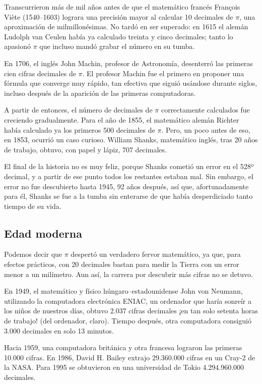 {Transcurrieron más de mil años antes de que el matemático francés Fran\c{c}ois Vi\`ete (1540--1603) lograra una precisión mayor 
al calcular 10 decimales de $\pi$, una aproximación de milmillonésimas. 
No tardó en ser superado: en 1615 el alemán Ludolph van Ceulen había ya calculado treinta y cinco decimales; tanto lo 
apasionó $\pi$ que incluso mandó grabar el número en su tumba.

En 1706, el inglés John Machin, profesor de Astronomía, desenterró las primeras cien cifras decimales de $\pi$. El profesor 
Machin fue el primero en proponer una fórmula que converge muy rápido, tan efectiva que siguió usándose durante siglos, incluso 
después de la aparición de las primeras computadoras.

A partir de entonces, el número de decimales de $\pi$ correctamente calculados fue creciendo gradualmente. 
Para el año de 1855, el matemático alemán Richter había calculado ya los primeros 500 decimales de $\pi$. Pero, un poco 
antes de eso, en 1853, ocurrió un caso curioso. William Shanks, matemático inglés, tras 20 años de trabajo, obtuvo, 
con papel y lápiz, 707 decimales. 

El final de la historia no es muy feliz, porque Shanks cometió un error en el 528º decimal, y a partir de ese punto todos 
los restantes estaban mal. Sin embargo, el error no fue descubierto hasta 1945, 92 años después, así que, afortunadamente 
para él, Shanks se fue a la tumba sin enterarse de que había desperdiciado tanto tiempo de su vida.

\subsection*{Edad moderna}
Podemos decir que $\pi$ despertó un verdadero fervor matemático, ya que, para efectos prácticos, con 20 decimales bastan 
para medir la Tierra con un error menor a un milímetro. Aun así, la carrera por descubrir más cifras no se detuvo.

En 1949, el matemático y físico húngaro--estadounidense John von Neumann, utilizando la computadora electrónica ENIAC, 
un ordenador que haría sonreír a los niños de nuestros días, obtuvo 2.037 cifras decimales ¡en tan solo setenta horas de 
trabajo! (del ordenador, claro). Tiempo después, otra computadora consiguió 3.000 decimales en solo 13 minutos.

Hacia 1959, una computadora británica y otra francesa lograron las primeras 10.000 cifras. 
En 1986, David H. Bailey extrajo 29.360.000 cifras en un Cray-2 de la NASA. Para 1995 se obtuvieron en una universidad 
de Tokio 4.294.960.000 decimales. 

}
